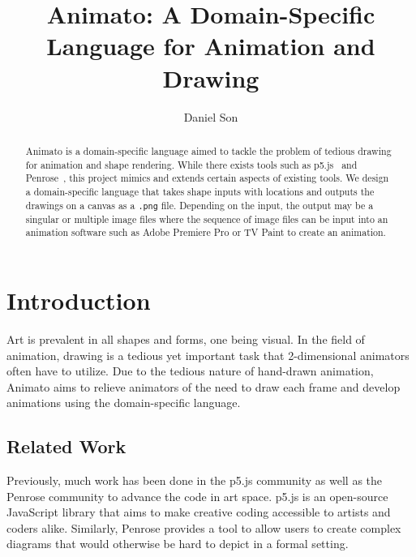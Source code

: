 \documentclass[acmsmall,screen]{acmart}
\begin{document}
\title{Animato: A Domain-Specific Language for Animation and Drawing}

\author{Daniel Son}

\renewcommand{\shortauthors}{Daniel Son}

\renewcommand\footnotetextcopyrightpermission[1]{}
\pagestyle{fancy}
\fancyfoot{}
\makeatletter
\let\@authorsaddresses\@empty
\makeatother

\begin{abstract}
    Animato is a domain-specific language aimed to tackle the problem of tedious drawing for animation and shape rendering.
    While there exists tools such as p5.js~\cite{p5js} and Penrose~\cite{penrose}, this project mimics and extends certain aspects of existing tools.
    We design a domain-specific language that takes shape inputs with locations and outputs the drawings on a canvas as a \texttt{.png} file.
    Depending on the input, the output may be a singular or multiple image files where the sequence of image files can be input into an animation software such as Adobe Premiere Pro or TV Paint to create an animation.
\end{abstract}

\maketitle
\thispagestyle{firstfancy}

\section{Introduction}
Art is prevalent in all shapes and forms, one being visual.
In the field of animation, drawing is a tedious yet important task that 2-dimensional animators often have to utilize.
Due to the tedious nature of hand-drawn animation, Animato aims to relieve animators of the need to draw each frame and develop animations using the domain-specific language.

\subsection{Related Work}
Previously, much work has been done in the p5.js \cite{p5js} community as well as the Penrose \cite{penrose} community to advance the code in art space. 
p5.js is an open-source JavaScript library that aims to make creative coding accessible to artists and coders alike. 
Similarly, Penrose provides a tool to allow users to create complex diagrams that would otherwise be hard to depict in a formal setting.
\end{document}
